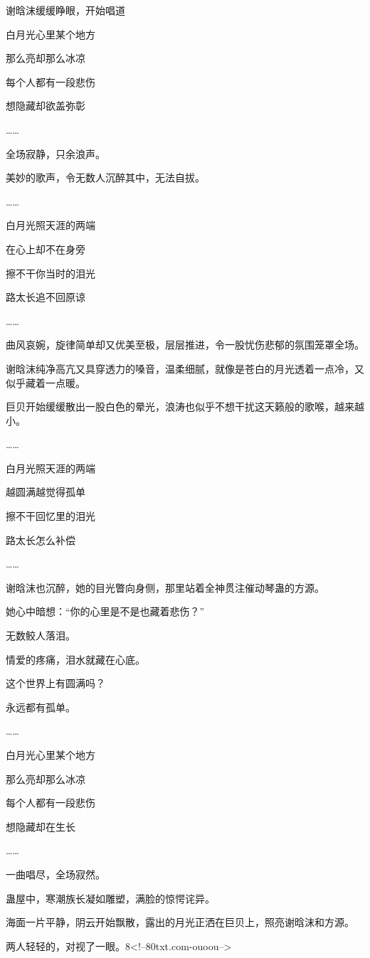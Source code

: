 \begin{this_body}
谢晗沫缓缓睁眼，开始唱道

白月光心里某个地方

那么亮却那么冰凉

每个人都有一段悲伤

想隐藏却欲盖弥彰

……

全场寂静，只余浪声。

美妙的歌声，令无数人沉醉其中，无法自拔。

……

白月光照天涯的两端

在心上却不在身旁

擦不干你当时的泪光

路太长追不回原谅

……

曲风哀婉，旋律简单却又优美至极，层层推进，令一股忧伤悲郁的氛围笼罩全场。

谢晗沫纯净高亢又具穿透力的嗓音，温柔细腻，就像是苍白的月光透着一点冷，又似乎藏着一点暖。

巨贝开始缓缓散出一股白色的晕光，浪涛也似乎不想干扰这天籁般的歌喉，越来越小。

……

白月光照天涯的两端

越圆满越觉得孤单

擦不干回忆里的泪光

路太长怎么补偿

……

谢晗沫也沉醉，她的目光瞥向身侧，那里站着全神贯注催动琴蛊的方源。

她心中暗想：“你的心里是不是也藏着悲伤？”

无数鲛人落泪。

情爱的疼痛，泪水就藏在心底。

这个世界上有圆满吗？

永远都有孤单。

……

白月光心里某个地方

那么亮却那么冰凉

每个人都有一段悲伤

想隐藏却在生长

……

一曲唱尽，全场寂然。

蛊屋中，寒潮族长凝如雕塑，满脸的惊愕诧异。

海面一片平静，阴云开始飘散，露出的月光正洒在巨贝上，照亮谢晗沫和方源。

两人轻轻的，对视了一眼。8<!--80txt.com-ouoou-->

\end{this_body}

